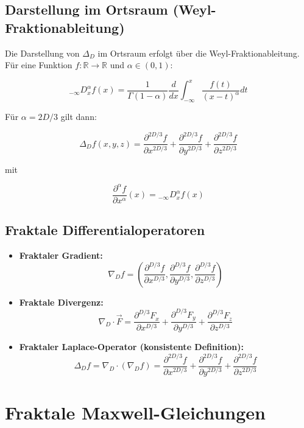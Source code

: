 \subsection{Darstellung im Ortsraum (Weyl-Fraktionableitung)}

Die Darstellung von \( \Delta_D \) im Ortsraum erfolgt über die Weyl-Fraktionableitung.
Für eine Funktion \( f: \mathbb{R} \to \mathbb{R} \) und \( \alpha \in (0,1) \):

\[
_{-\infty}D_x^{\alpha} f(x) = \frac{1}{\Gamma(1-\alpha)} \frac{d}{dx} \int_{-\infty}^x \frac{f(t)}{(x-t)^{\alpha}} dt
\]

Für \( \alpha = 2D/3 \) gilt dann:

\[
\Delta_D f(x,y,z) = \frac{\partial^{2D/3} f}{\partial x^{2D/3}} + \frac{\partial^{2D/3} f}{\partial y^{2D/3}} + \frac{\partial^{2D/3} f}{\partial z^{2D/3}}
\]

mit

\[
\frac{\partial^{\alpha} f}{\partial x^{\alpha}}(x) = {}_{-\infty}D_x^{\alpha} f(x)
\]

\subsection{Fraktale Differentialoperatoren}

\begin{itemize}
    \item \textbf{Fraktaler Gradient:}
    \[
    \nabla_D f = \left( \frac{\partial^{D/3} f}{\partial x^{D/3}}, 
                      \frac{\partial^{D/3} f}{\partial y^{D/3}}, 
                      \frac{\partial^{D/3} f}{\partial z^{D/3}} \right)
    \]
    
    \item \textbf{Fraktale Divergenz:}
    \[
    \nabla_D \cdot \vec{F} = \frac{\partial^{D/3} F_x}{\partial x^{D/3}} + 
                            \frac{\partial^{D/3} F_y}{\partial y^{D/3}} + 
                            \frac{\partial^{D/3} F_z}{\partial z^{D/3}}
    \]
    
    \item \textbf{Fraktaler Laplace-Operator (konsistente Definition):}
    \[
    \Delta_D f = \nabla_D \cdot (\nabla_D f) = \frac{\partial^{2D/3} f}{\partial x^{2D/3}} + 
                                              \frac{\partial^{2D/3} f}{\partial y^{2D/3}} + 
                                              \frac{\partial^{2D/3} f}{\partial z^{2D/3}}
    \]
\end{itemize}

\section{Fraktale Maxwell-Gleichungen}

